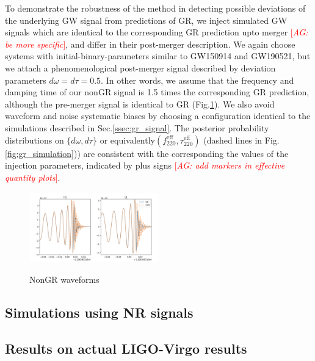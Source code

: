 \documentclass[twocolumn,prd,superscriptaddress,amsfonts,amssymb,amsmath,preprintnumbers]{revtex4-1}
\newcommand{\abhi}[1]{\textcolor{red}{[\textit{AG: #1}]}}
\begin{document}
To demonstrate the robustness of the method in detecting possible deviations of the underlying GW signal from predictions of GR, we inject simulated GW signals which are identical to the corresponding GR prediction upto merger \abhi{be more specific}, and differ in their post-merger description. We again choose systems with initial-binary-parameters similar to GW150914 and GW190521, but we attach a phenomenological post-merger signal described by deviation parameters $d\omega =d\tau = 0.5$. In other words, we assume that the frequency and damping time of our nonGR signal is 1.5 times the corresponding GR prediction, although the pre-merger signal is identical to GR (Fig.\ref{fig:nongr_waveform}). We also avoid waveform and noise systematic biases by choosing a configuration identical to the simulations described in Sec.\ref{ssec:gr_signal}. The posterior probability distributions on $\{d\omega,d\tau\}$ or equivalently$(f_{220}^{\text{eff}}, \tau _{220}^{\text{eff}})$ (dashed lines in Fig.\ref{fig:gr_simulation})) are consistent with the corresponding the values of the injection parameters, indicated by plus signs \abhi{add markers in effective quantity plots}.

\begin{figure}
	\includegraphics[width=0.5\textwidth]{figures/modGR_waveforms.png}\label{fig:nongr_waveform}
	\caption{NonGR waveforms}
\end{figure}

\subsection{Simulations using NR signals}

\subsection{Results on actual LIGO-Virgo results}
\end{document}
